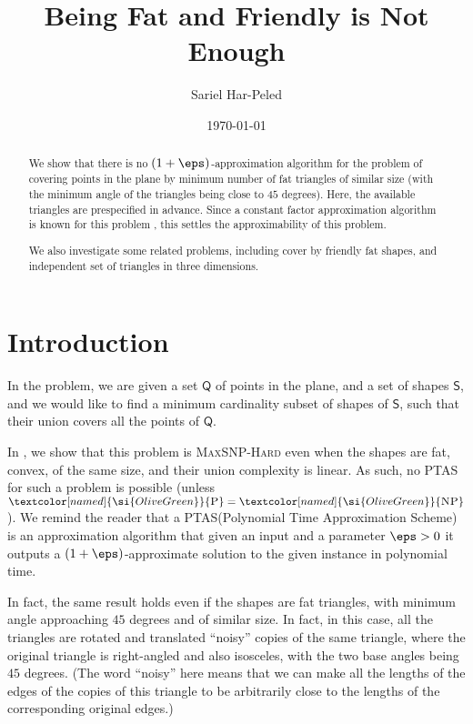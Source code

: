 \documentclass[12pt]{article}
\newcommand{\PntSet}{{\mathsf{Q}}}
\newcommand{\ObjSet}{\mathsf{S}}
\providecommand{\ComplexityClass}[1]{{{\textcolor[named]{\si{OliveGreen}}{\textsc{#1}}}}}
\providecommand{\MaxSNPHard}{{\ComplexityClass{Max{S}NP-Hard}}\xspace}
\providecommand{\NP}{\ComplexityClass{NP}\xspace}
\providecommand{\POLYT}{\ComplexityClass{P}\xspace}
\providecommand{\PTAS}{\textsf{\si{PTAS}}\xspace}
\begin{document}
\title{Being Fat and Friendly is Not Enough}


\author{Sariel Har-Peled\SarielThanks{}}

\date{\today}

\maketitle

\begin{abstract}
    We show that there is no $(1+\eps)$-approximation algorithm for
    the problem of covering points in the plane by minimum number of
    fat triangles of similar size (with the minimum angle of the
    triangles being close to $45$ degrees). Here, the available
    triangles are prespecified in advance. Since a constant factor
    approximation algorithm is known for this problem
    \cite{cv-iaags-07}, this settles the approximability of this
    problem.

    We also investigate some related problems, including cover by
    friendly fat shapes, and independent set of triangles in three
    dimensions.
\end{abstract}

\section{Introduction}


In the  problem, we are given a set $\PntSet$
of points in the plane, and a set of shapes $\ObjSet$, and we would
like to find a minimum cardinality subset of shapes of $\ObjSet$, such
that their union covers all the points of $\PntSet$.

In , we show that this problem is \MaxSNPHard even when
the shapes are fat, convex, of the same size, and their union
complexity is linear. As such, no \PTAS for such a problem is possible
(unless $\POLYT = \NP$). We remind the reader that a \PTAS (Polynomial
Time Approximation Scheme) is an approximation algorithm that given an
input and a parameter $\eps>0$ it outputs a $(1+\eps)$-approximate
solution to the given instance in polynomial time.

In fact, the same result holds even if the shapes are fat triangles,
with minimum angle approaching $45$ degrees and of similar size. In
fact, in this case, all the triangles are rotated and translated
``noisy'' copies of the same triangle, where the original triangle is
right-angled and also isosceles, with the two base angles being $45$
degrees. (The word ``noisy'' here means that we can make all the
lengths of the edges of the copies of this triangle to be arbitrarily
close to the lengths of the corresponding original edges.)
    
\end{document}
